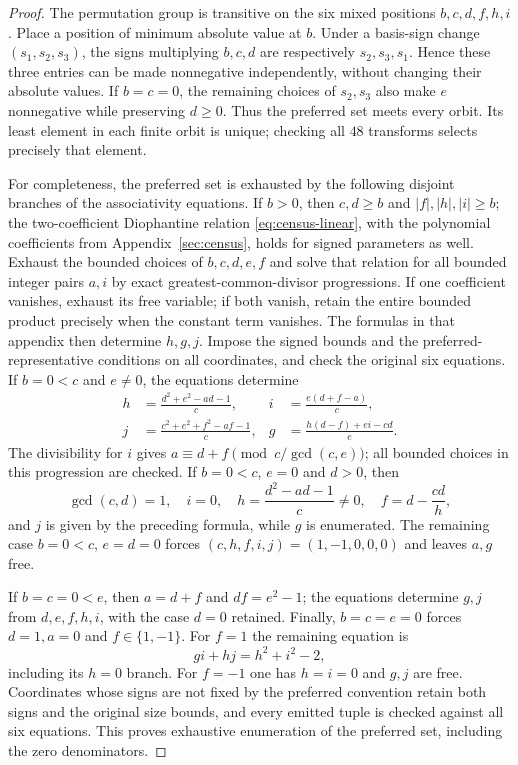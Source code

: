 \begin{proof}
The permutation group is transitive on the six mixed positions
$b,c,d,f,h,i$. Place a position of minimum absolute value at $b$.
Under a basis-sign change $(s_1,s_2,s_3)$, the signs multiplying
$b,c,d$ are respectively $s_2,s_3,s_1$. Hence these three entries
can be made nonnegative independently, without changing their
absolute values. If $b=c=0$, the remaining choices of $s_2,s_3$
also make $e$ nonnegative while preserving $d\geq0$.
Thus the preferred set meets every orbit. Its least element in
each finite orbit is unique; checking all $48$ transforms selects
precisely that element.

For completeness, the preferred set is exhausted by the following
disjoint branches of the associativity equations. If $b>0$, then
$c,d\geq b$ and $|f|,|h|,|i|\geq b$; the two-coefficient
Diophantine relation \eqref{eq:census-linear}, with the polynomial
coefficients from Appendix~\ref{sec:census}, holds for signed
parameters as well. Exhaust the bounded choices of $b,c,d,e,f$
and solve that relation for all bounded integer pairs $a,i$ by
exact greatest-common-divisor progressions. If one coefficient
vanishes, exhaust its free variable; if both vanish, retain the
entire bounded product precisely when the constant term vanishes.
The formulas in that appendix then determine $h,g,j$. Impose the
signed bounds and the preferred-representative conditions on all
coordinates, and check the original six equations.
If $b=0<c$ and $e\ne0$, the equations determine
\begin{align*}
 h&=\frac{d^2+e^2-ad-1}{c},&
 i&=\frac{e(d+f-a)}c,\\
 j&=\frac{c^2+e^2+f^2-af-1}{c},&
 g&=\frac{h(d-f)+ei-cd}{e}.
\end{align*}
The divisibility for $i$ gives
$a\equiv d+f\pmod{c/\gcd(c,e)}$; all bounded choices in this
progression are checked. If $b=0<c$, $e=0$ and $d>0$, then
\[
 \gcd(c,d)=1,\quad i=0,\quad
 h=\frac{d^2-ad-1}{c}\ne0,\quad f=d-\frac{cd}{h},
\]
and $j$ is given by the preceding formula, while $g$ is enumerated.
The remaining case $b=0<c$, $e=d=0$ forces
$(c,h,f,i,j)=(1,-1,0,0,0)$ and leaves $a,g$ free.

If $b=c=0<e$, then $a=d+f$ and $df=e^2-1$;
the equations determine $g,j$ from $d,e,f,h,i$, with the case
$d=0$ retained. Finally, $b=c=e=0$ forces $d=1,a=0$ and
$f\in\{1,-1\}$. For $f=1$ the remaining equation is
\[
 gi+hj=h^2+i^2-2,
\]
including its $h=0$ branch. For $f=-1$ one has $h=i=0$
and $g,j$ are free. Coordinates whose signs are not fixed by the
preferred convention retain both signs and the original size
bounds, and every emitted tuple is checked
against all six equations. This proves exhaustive enumeration
of the preferred set, including the zero denominators.


\end{proof}

